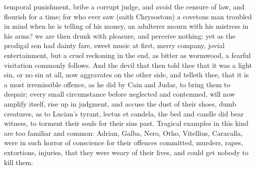 {temporal punishment, bribe a corrupt judge, and avoid the censure
of law, and flourish for a time; for who ever saw (saith
Chrysostom) a covetous man troubled in mind when he is telling of his
money, an adulterer mourn with his mistress in his arms? we are then
drunk with pleasure, and perceive nothing: yet as the prodigal son had
dainty fare, sweet music at first, merry company, jovial entertainment,
but a cruel reckoning in the end, as bitter as wormwood, a fearful
visitation commonly follows. And the devil that then told thee that it
was a light sin, or no sin at all, now aggravates on the other side,
and telleth thee, that it is a most irremissible offence, as he did by
Cain and Judas, to bring them to despair; every small circumstance
before neglected and contemned, will now amplify itself, rise up in
judgment, and accuse the dust of their shoes, dumb creatures, as to
Lucian's tyrant, lectus et candela, the bed and candle did bear
witness, to torment their souls for their sins past. Tragical examples
in this kind are too familiar and common: Adrian, Galba, Nero, Otho,
Vitellius, Caracalla, were in such horror of conscience for their
offences committed, murders, rapes, extortions, injuries, that they
were weary of their lives, and could get nobody to kill them.

}

